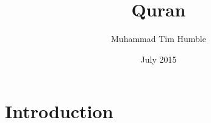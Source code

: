 \documentclass{book}
\title{Quran}
\author{Muhammad Tim Humble}
\date{July 2015}
\begin{document}
\maketitle

\section{Introduction}
\end{document}
